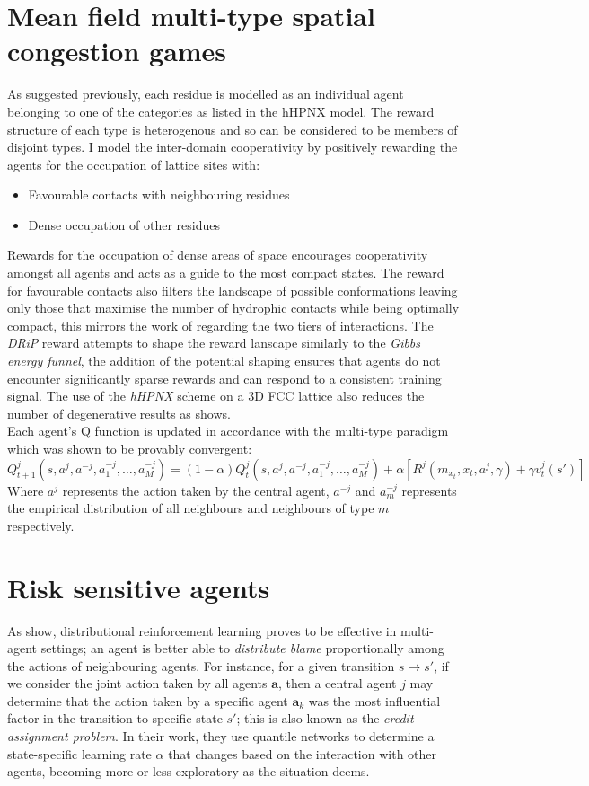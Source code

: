 \section{Mean field multi-type spatial congestion games}
As suggested previously, each residue is modelled as an individual agent belonging to one of the
categories as listed in the hHPNX model. The reward structure of each type is heterogenous and so can be considered
to be members of disjoint types. I model the inter-domain cooperativity by positively rewarding
the agents for the occupation of lattice sites with:
\begin{itemize}
    \item Favourable contacts with neighbouring residues 
    \item Dense occupation of other residues
\end{itemize}
Rewards for the occupation of dense areas of space encourages cooperativity amongst all
agents and acts as a guide to the most compact states. The reward for favourable contacts
also filters the landscape of possible conformations leaving only those that maximise
the number of hydrophic contacts while being optimally compact, this mirrors the
work of \cite{Yang} regarding the two tiers of interactions. The \emph{DRiP} reward attempts to
shape the reward lanscape similarly to the \emph{Gibbs energy funnel}, the addition
of the potential shaping ensures that agents do not encounter significantly sparse rewards
and can respond to a consistent training signal.
The use of the \emph{hHPNX} scheme on a 3D FCC lattice also reduces the number of degenerative 
results as \cite{Hoque} shows.\\

Each agent's Q function is updated in accordance with the multi-type paradigm which was shown to be provably convergent:
\begin{equation}
    Q^j_{t+1}(s,a^j,a^{-j}, a^{-j}_1, \hdots , a^{-j}_M)= (1-\alpha)Q^j_t(s,a^j,a^{-j}, a^{-j}_1, \hdots , a^{-j}_M) +\alpha[R^j(m_{x_t}, x_t, a^j, \gamma)+ \gamma v^j_t(s')]
\end{equation}
Where $a^j$ represents the action taken by the central agent, $a^{-j}$ and $a^{-j}_m$ represents
the empirical distribution of all neighbours and neighbours of type $m$ respectively.
\section{Risk sensitive agents}
As \cite{Xueguang2018} show, distributional reinforcement learning proves to be effective
in multi-agent settings; an agent is better able to \emph{distribute blame} proportionally
among the actions of neighbouring agents. For instance, for a given transition $s\rightarrow s'$,
if we consider the joint action taken by all agents $\mathbf{a}$, then a central agent $j$ may determine
that the action taken by a specific agent $\mathbf{a}_k$ was the most influential factor in the
transition to specific state $s'$; this is also known as the \emph{credit assignment problem}. In their work, they use quantile networks to determine a state-specific learning rate $\alpha$
that changes based on the interaction with other agents, becoming more or less exploratory
as the situation deems.\\

